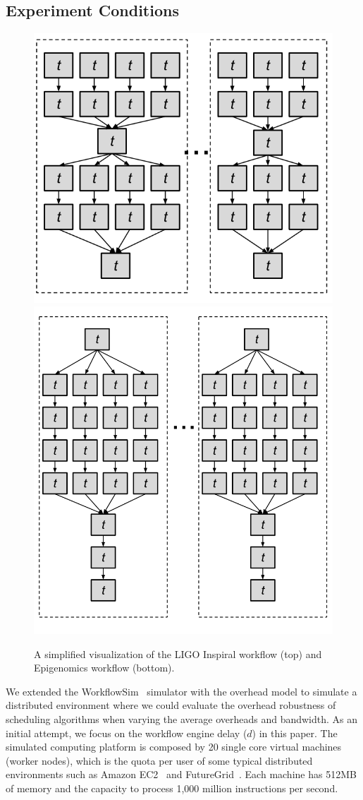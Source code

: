 \documentclass[final]{IEEEtran}
\begin{document}
\subsection{Experiment Conditions}


\begin{figure}[htb]
	\centering
	\includegraphics[width=0.65\linewidth]{figure/shape_of_inspiral.png} \\
	\includegraphics[width=0.7\linewidth]{figure/shape_of_genome.png}
	\caption{A simplified visualization of the LIGO Inspiral workflow (top) and Epigenomics workflow (bottom).}
	\label{fig:shape}
	\vspace{-10pt}
\end{figure}

We extended the WorkflowSim~\cite{WorkflowSim} simulator with the overhead model to simulate a distributed environment where we could evaluate the overhead robustness of scheduling algorithms when varying the average overheads and bandwidth. As an initial attempt, we focus on the workflow engine delay ($d$) in this paper. The simulated computing platform is composed by 20 single core virtual machines (worker nodes), which is the quota per user of some typical distributed environments such as Amazon EC2~\cite{AmazonAWS} and FutureGrid~\cite{FutureGrid}. Each machine has 512MB of memory and the capacity to process 1,000 million instructions per second. 
\end{document}
